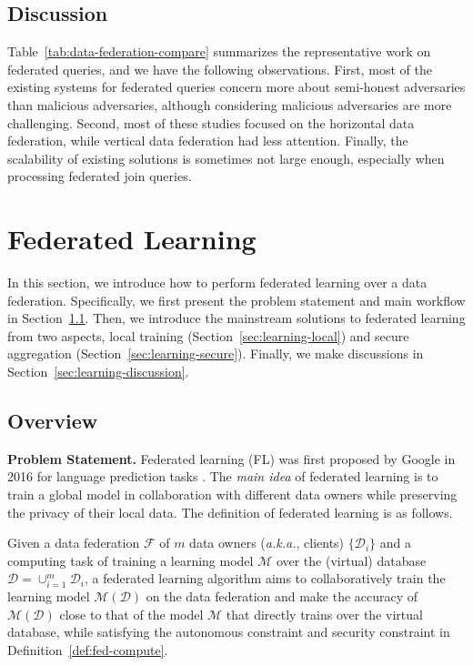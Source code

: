 \documentclass[11pt]{article}
\newcommand{\aka}{\textit{a.k.a.},\xspace}
\newcommand\tabref[1]{Table~\ref{#1}}
\newcommand\secref[1]{Section~\ref{#1}}
\newcommand\defref[1]{Definition~\ref{#1}}
\newcommand{\fakeparagraph}[1]{\vspace{1mm}\noindent\textbf{#1.}}
\newcommand{\FNew}{\mathcal{F}}
\newcommand{\D}{\mathcal{D}}
\newcommand{\M}{\mathcal{M}}
\begin{document}
\subsection{Discussion}\label{sec:data-summary}

\tabref{tab:data-federation-compare} summarizes the representative work on federated queries, and we have the following observations. First, most of the existing systems for federated queries concern more about semi-honest adversaries than malicious adversaries, although considering malicious adversaries are more challenging. Second, most of these studies focused on the horizontal data federation, while vertical data federation had less attention. Finally, the scalability of existing solutions is sometimes not large enough, especially when processing federated join queries.

\section{Federated Learning}\label{sec:learning}

In this section, we introduce how to perform federated learning over a data federation.
Specifically, we first present the problem statement and main workflow in \secref{sec:learning-overview}.
Then, we introduce the mainstream solutions to federated learning from two aspects,
local training (\secref{sec:learning-local}) and secure aggregation (\secref{sec:learning-secure}).
Finally, we make discussions in \secref{sec:learning-discussion}.

\subsection{Overview}\label{sec:learning-overview}

\fakeparagraph{Problem Statement} Federated learning (FL) was first proposed by Google in 2016 for language prediction tasks \cite{Yongxin-DBLP:conf/aistats/McMahanMRHA17}. The \textit{main idea} of federated learning is to train a global model in collaboration with different data owners while preserving the privacy of their local data. The definition of federated learning is as follows.

\begin{definition}\label{def:fed-learning}
Given a data federation $\FNew$ of $m$ data owners (\aka clients) $\{\D_i\}$ and a computing task of training a learning model $\M$ over the (virtual) database $\D=\cup_{i=1}^{m}{\D_i}$, a federated learning algorithm aims to collaboratively train the learning model $\M(\D)$ on the data federation and make the accuracy of $\M(\D)$ close to that of the model $\M$ that directly trains over the virtual database, while satisfying the autonomous constraint and security constraint in \defref{def:fed-compute}.
\end{definition}
\end{document}
